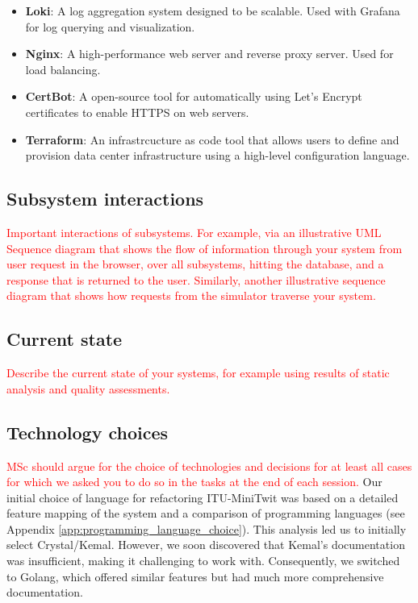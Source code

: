 \begin{multicols}{2}
\begin{itemize}
        \item \textbf{Loki}: A log aggregation system designed to be scalable. Used with Grafana for log querying and visualization.
        \item \textbf{Nginx}: A high-performance web server and reverse proxy server. Used for load balancing.
        \item \textbf{CertBot}: A open-source tool for automatically using Let's Encrypt certificates to enable HTTPS on web servers.
        \item \textbf{Terraform}: An infrastrcucture as code tool that allows users to define and provision data center infrastructure using a high-level configuration language. %
    \end{itemize}
\end{multicols}



\subsection{Subsystem interactions}
\textcolor{red}{Important interactions of subsystems.
For example, via an illustrative UML Sequence diagram that shows the flow of information through your system from user request in the browser, over all subsystems, hitting the database, and a response that is returned to the user.
Similarly, another illustrative sequence diagram that shows how requests from the simulator traverse your system.}
\subsection{Current state}
\textcolor{red}{Describe the current state of your systems, for example using results of static analysis and quality assessments.}
\subsection{Technology choices}%
\textcolor{red}{MSc should argue for the choice of technologies and decisions for at least all cases for which we asked you to do so in the tasks at the end of each session.}
Our initial choice of language for refactoring ITU-MiniTwit was based on a detailed feature mapping of the system and a comparison of programming languages (see Appendix \ref{app:programming_language_choice}). 
This analysis led us to initially select Crystal/Kemal. However, we soon discovered that Kemal's documentation was insufficient, making it challenging to work with. Consequently, we switched to Golang, which offered similar features but had much more comprehensive documentation.